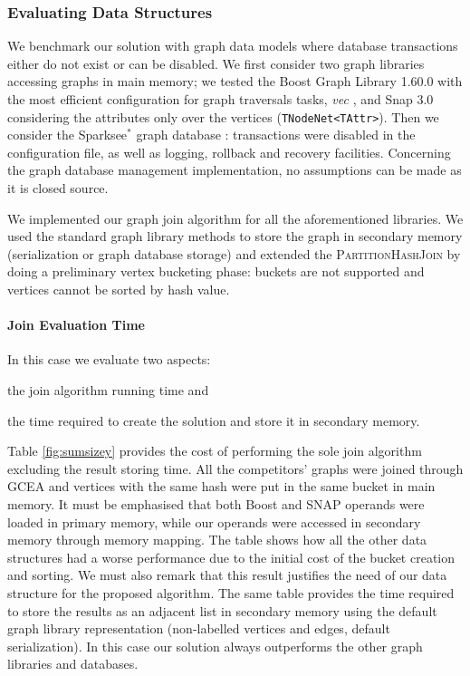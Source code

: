 \subsubsection{Evaluating Data Structures}\label{sec:qbench}
We benchmark our solution with graph data models where
database transactions
either do not exist or {can } be disabled.
We first consider two graph libraries accessing graphs in main memory;
we tested the Boost Graph Library 1.60.0 with the  most efficient configuration for graph traversals tasks,
\textit{vec} \cite{BGL}, and
Snap 3.0 \cite{leskovec2016snap} considering the attributes only
over the vertices (\texttt{TNodeNet<TAttr>}).
Then we consider the Sparksee$^*$ graph database \cite{Dominguez}: transactions were disabled in the configuration
file, as well as logging, rollback and recovery facilities.
Concerning the graph database management implementation, no assumptions {can } be made
as it is closed source.

We implemented our graph join algorithm for all the aforementioned libraries.
We used the standard graph library methods to store the graph in secondary memory (serialization
or graph database storage) and extended the \textsc{PartitionHashJoin} by doing a preliminary
vertex bucketing phase:
buckets are not supported and vertices cannot be sorted by hash value.


\paragraph*{Join Evaluation Time} In this case we  evaluate two aspects: \begin{enumerate*}[label=\textit{(\roman*)}]
	\item the join algorithm running time and
	\item the time required to create the solution
	and store it in secondary memory.
\end{enumerate*}

Table  \ref{fig:sumsizey} provides the cost of performing the sole join algorithm excluding the
result storing time.  All the competitors' graphs were joined through GCEA and vertices with the same hash were put in the same bucket
in main memory.
It must be emphasised that
both Boost and SNAP operands were loaded in
primary memory, while our operands were accessed in secondary memory through memory mapping.
The table shows
how all the other data structures had a worse performance due to the initial cost of the bucket creation and
sorting. We must also remark that
this result justifies the need of our data structure for the proposed algorithm.
The same table provides the time required to store the
results as an adjacent list in secondary memory using the default graph library representation (non-labelled vertices and edges, default serialization). In this case our solution always
outperforms the other graph libraries and databases.

